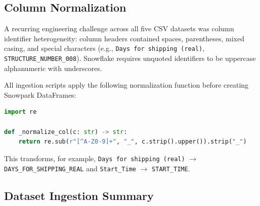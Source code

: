 \documentclass[14.5pt,letterpaper]{article}
\begin{document}
\subsection{Column Normalization}

A recurring engineering challenge across all five CSV datasets was column identifier heterogeneity: column headers contained spaces, parentheses, mixed casing, and special characters (e.g., \texttt{Days for shipping (real)}, \texttt{STRUCTURE\_NUMBER\_008}). Snowflake requires unquoted identifiers to be uppercase alphanumeric with underscores.

All ingestion scripts apply the following normalization function before creating Snowpark DataFrames:

\begin{lstlisting}[language=Python, caption={Column normalization applied to all ingested CSVs}]
import re

def _normalize_col(c: str) -> str:
    return re.sub(r"[^A-Z0-9]+", "_", c.strip().upper()).strip("_")
\end{lstlisting}

This transforms, for example, \texttt{Days for shipping (real)} $\rightarrow$ \texttt{DAYS\_FOR\_SHIPPING\_REAL} and \texttt{Start\_Time} $\rightarrow$ \texttt{START\_TIME}.

\subsection{Dataset Ingestion Summary}
\end{document}
